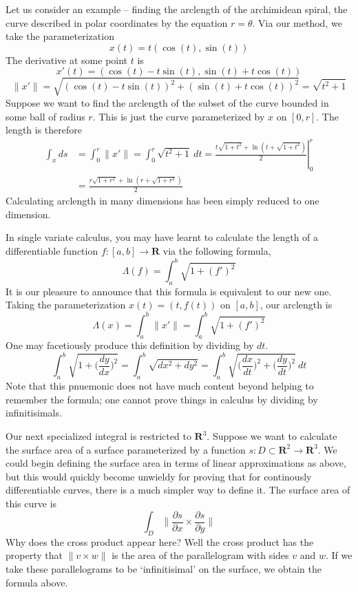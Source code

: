 \documentclass[12pt]{amsbook}
\theoremstyle{plain}
\theoremstyle{definition}
\begin{document}
Let us consider an example -- finding the arclength of the archimidean spiral, the curve described in polar coordinates by the equation $r = \theta$. Via our method, we take the parameterization
%
\[ x(t) = t(\cos(t), \sin(t)) \]
%
The derivative at some point $t$ is
%
\[ x'(t) = (\cos(t) - t\sin(t), \sin(t) + t\cos(t)) \]
%
\[ \|x'\| = \sqrt{(\cos(t) - t\sin(t))^2 + (\sin(t) + t\cos(t))^2} = \sqrt{t^2 + 1} \]
%
Suppose we want to find the arclength of the subset of the curve bounded in some ball of radius $r$. This is just the curve parameterized by $x$ on $[0,r]$. The length is therefore
%
\begin{align*}
    \int_x ds &= \int_0^r \|x'\| = \int_0^r \sqrt{t^2 + 1}\ dt = \left. \frac{t\sqrt{1 + t^2} + \ln(t + \sqrt{1 + t^2})}{2} \right|_0^r\\
    &= \frac{r\sqrt{1 + r^2} + \ln(r + \sqrt{1 + r^2})}{2}
\end{align*}
%
Calculating arclength in many dimensions has been simply reduced to one dimension.

In single variate calculus, you may have learnt to calculate the length of a differentiable function $f:[a,b] \to \mathbf{R}$ via the following formula,
%
\[ \Lambda(f) = \int_a^b \sqrt{1 + (f')^2} \]
%
It is our pleasure to announce that this formula is equivalent to our new one. Taking the parameterization $x(t) = (t,f(t))$ on $[a,b]$, our arclength is
%
\[ \Lambda(x) = \int_a^b \|x'\| = \int_a^b \sqrt{1 + (f')^2} \]
%
One may facetiously produce this definition by dividing by $dt$.
%
\[ \int_a^b \sqrt{1 + \bigg(\frac{dy}{dx}\bigg)^2} = \int_a^b \sqrt{dx^2 + dy^2} = \int_a^b \sqrt{\bigg(\frac{dx}{dt}\bigg)^2 + \bigg(\frac{dy}{dt}\bigg)^2}\ dt \]
%
Note that this pnuemonic does not have much content beyond helping to remember the formula; one cannot prove things in calculus by dividing by infinitisimals.

Our next specialized integral is restricted to $\mathbf{R}^3$. Suppose we want to calculate the surface area of a surface parameterized by a function $s:D \subset \mathbf{R}^2 \to \mathbf{R}^3$. We could begin defining the surface area in terms of linear approximations as above, but this would quickly become unwieldy for proving that for continously differentiable curves, there is a much simpler way to define it. The surface area of this curve is
%
\[ \int_D \bigg\| \frac{\partial s}{\partial x} \times \frac{\partial s}{\partial y} \bigg\| \]
%
Why does the cross product appear here? Well the cross product has the property that $\|v \times w\|$ is the area of the parallelogram with sides $v$ and $w$. If we take these parallelograms to be `infinitisimal' on the surface, we obtain the formula above.
\end{document}
